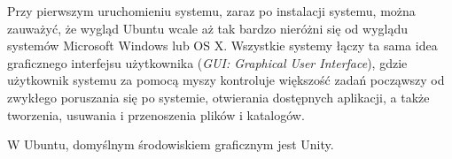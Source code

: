Przy pierwszym uruchomieniu systemu, zaraz po instalacji systemu, można zauważyć, że wygląd Ubuntu wcale aż tak bardzo nieróżni się od wyglądu systemów Microsoft Windows lub OS X. Wszystkie systemy łączy ta sama idea graficznego interfejsu użytkownika (\textit{GUI: Graphical User Interface}), gdzie użytkownik systemu za pomocą myszy kontroluje większość zadań począwszy od zwykłego poruszania się po systemie, otwierania dostępnych aplikacji, a także tworzenia, usuwania i przenoszenia plików i katalogów.

W Ubuntu, domyślnym środowiskiem graficznym jest Unity.
\clearpage